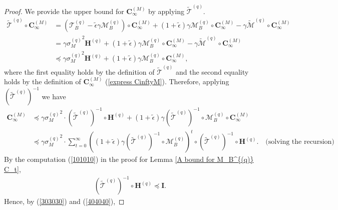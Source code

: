 \documentclass[11pt, letterpaper]{article}
\begin{document}
\begin{proof}
    We provide the upper bound for $\mathbf{C}_\infty^{(M)}$ by applying $\widetilde{\mathcal{T}}^{(q)}$.
    \begin{equation*}
        \begin{aligned}
            \widetilde{\mathcal{T}}^{(q)}\circ\mathbf{C}_\infty^{(M)} & =(\mathcal{T}_B^{(q)}-\tilde{\epsilon}\gamma\mathcal{M}_B^{(q)})\circ\mathbf{C}_\infty^{(M)}+(1+\tilde{\epsilon})\gamma\mathcal{M}_B^{(q)}\circ\mathbf{C}_\infty^{(M)}-\gamma\widetilde{\mathcal{M}}^{(q)}\circ\mathbf{C}_\infty^{(M)} \\
            & =\gamma{\sigma_M^{(q)}}^2\mathbf{H}^{(q)}+(1+\tilde{\epsilon})\gamma\mathcal{M}_B^{(q)}\circ\mathbf{C}_\infty^{(M)}-\gamma\widetilde{\mathcal{M}}^{(q)}\circ\mathbf{C}_\infty^{(M)}\\
            & \preceq\gamma{\sigma_M^{(q)}}^2\mathbf{H}^{(q)}+(1+\tilde{\epsilon})\gamma\mathcal{M}_B^{(q)}\circ\mathbf{C}_\infty^{(M)},
        \end{aligned}
    \end{equation*}
    where the first equality holds by the definition of $\widetilde{\mathcal{T}}^{(q)}$ and the second equality holds by the definition of $\mathbf{C}_\infty^{(M)}$ (\ref{express CinftyM}).
    Therefore, applying $(\widetilde{\mathcal{T}}^{(q)})^{-1}$ we have
    \begin{equation}
    \label{303030}
        \begin{aligned}
            \mathbf{C}_{\infty}^{(M)} & \preceq\gamma{\sigma_M^{(q)}}^2\cdot(\widetilde{\mathcal{T}}^{(q)})^{-1}\circ\mathbf{H}^{(q)}+(1+\tilde{\epsilon})\gamma(\widetilde{\mathcal{T}}^{(q)})^{-1}\circ\mathcal{M}_B^{(q)}\circ\mathbf{C}_\infty^{(M)} \\
            & \preceq\gamma{\sigma_M^{(q)}}^2\cdot\sum_{t=0}^\infty((1+\tilde{\epsilon})\gamma(\widetilde{\mathcal{T}}^{(q)})^{-1}\circ\mathcal{M}_B^{(q)})^t\circ(\widetilde{\mathcal{T}}^{(q)})^{-1}\circ\mathbf{H}^{(q)}.\quad\text{(solving the recursion)}
        \end{aligned}
    \end{equation}
    By the computation (\ref{101010}) in the proof for Lemma \ref{A bound for M_B^{(q)} C_t},
    \begin{equation}
    \label{404040}
        \begin{aligned}
            (\widetilde{\mathcal{T}}^{(q)})^{-1}\circ\mathbf{H}^{(q)}  \preceq \mathbf{I}.
        \end{aligned}
    \end{equation}
    Hence, by (\ref{303030}) and (\ref{404040}),

\end{proof}
\end{document}
